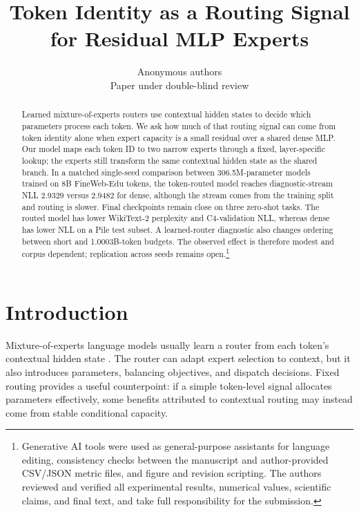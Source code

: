 \documentclass[10pt]{article}
\title{Token Identity as a Routing Signal for Residual MLP Experts}
\author{\name Anonymous authors \\
      \addr Paper under double-blind review}
\theoremstyle{definition}
\theoremstyle{remark}
\begin{document}
\maketitle

\begin{abstract}
Learned mixture-of-experts routers use contextual hidden states to decide which parameters process each token. We ask how much of that routing signal can come from token identity alone when expert capacity is a small residual over a shared dense MLP. Our model maps each token ID to two narrow experts through a fixed, layer-specific lookup; the experts still transform the same contextual hidden state as the shared branch. In a matched single-seed comparison between 306.5M-parameter models trained on 8B FineWeb-Edu tokens, the token-routed model reaches diagnostic-stream NLL 2.9329 versus 2.9482 for dense, although the stream comes from the training split and routing is slower. Final checkpoints remain close on three zero-shot tasks. The routed model has lower WikiText-2 perplexity and C4-validation NLL, whereas dense has lower NLL on a Pile test subset. A learned-router diagnostic also changes ordering between short and 1.0003B-token budgets. The observed effect is therefore modest and corpus dependent; replication across seeds remains open.\footnote{Generative AI tools were used as general-purpose assistants for language editing, consistency checks between the manuscript and author-provided CSV/JSON metric files, and figure and revision scripting. The authors reviewed and verified all experimental results, numerical values, scientific claims, and final text, and take full responsibility for the submission.}
\par
\end{abstract}

\section{Introduction}
\label{sec:introduction}

Mixture-of-experts language models usually learn a router from each token's contextual hidden state \citep{shazeer2017outrageously,fedus2022switch,jiang2024mixtral}. The router can adapt expert selection to context, but it also introduces parameters, balancing objectives, and dispatch decisions. Fixed routing provides a useful counterpoint: if a simple token-level signal allocates parameters effectively, some benefits attributed to contextual routing may instead come from stable conditional capacity.
\end{document}
